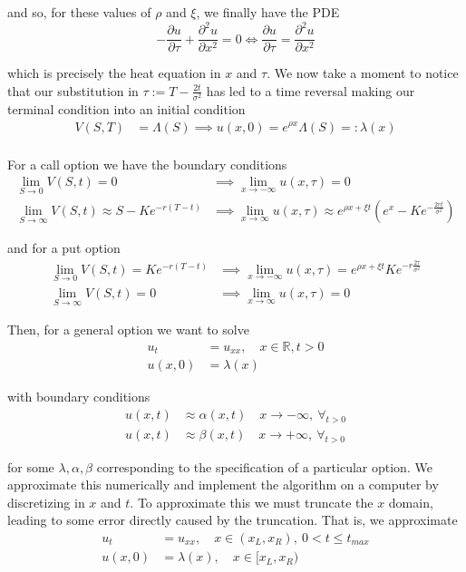 \documentclass[12pt]{article}
\newcommand{\R}{\mathbb R}
\begin{document}
and so, for these values of $\rho$ and $\xi$, we finally have the PDE
\begin{equation*}
	-\frac{\partial u}{\partial \tau} + \frac{\partial^2 u}{\partial x^2} = 0 \iff \frac{\partial u}{\partial \tau} = \frac{ \partial^2 u }{ \partial x^2 }
\end{equation*}

which is precisely the heat equation in $x$ and $\tau$. We now take a moment to notice that our substitution in $\tau:= T - \frac{2t}{\sigma^2}$ has led to a time reversal making our terminal condition into an initial condition
\begin{align*}
	V(S, T) &= \Lambda(S) \implies u(x, 0) = e^{\rho x}\Lambda(S) =: \lambda(x) \\
\end{align*}

For a call option we have the boundary conditions
\begin{align*}
	\lim_{S \to 0} V(S, t) = 0 &\implies \lim_{x\to-\infty} u(x, \tau) = 0 \\
	\lim_{S \to \infty} V(S, t) \approx S - Ke^{-r(T - t)} &\implies \lim_{x\to\infty} u(x, \tau) \approx e^{ \rho x + \xi t} \left( e^x - Ke^{-\frac{2rt}{\sigma^2}} \right)
\end{align*}

and for a put option
\begin{align*}
	\lim_{S \to 0} V(S, t) = Ke^{-r(T - t)} &\implies \lim_{x\to-\infty} u(x, \tau) = e^{ \rho x + \xi t}Ke^{-r\frac{2\tau}{\sigma^2}} \\
	\lim_{S \to \infty} V(S, t) = 0 &\implies \lim_{x\to\infty} u(x, \tau) = 0
\end{align*}

Then, for a general option we want to solve
\begin{align*}
	u_t &= u_{xx}, \quad x \in \R, t > 0 \\
	u(x,0) &= \lambda(x)
\end{align*}

with boundary conditions
\begin{align*}
	u(x, t) &\approx \alpha(x, t) \quad x\to-\infty,~\forall_{t > 0} \\
	u(x, t) &\approx \beta(x, t) \quad x\to+\infty,~\forall_{t > 0}
\end{align*}

for some $\lambda, \alpha, \beta$ corresponding to the specification of a particular option. We approximate this numerically and implement the algorithm on a computer by discretizing in $x$ and $t$. To approximate this we must truncate the $x$ domain, leading to some error directly caused by the truncation. That is, we approximate
\begin{align*}
	u_t &= u_{xx}, \quad x\in(x_L, x_R),~0<t\leq t_{max} \\
	u(x, 0) &= \lambda(x), \quad x\in[x_L, x_R)
\end{align*}
\end{document}
